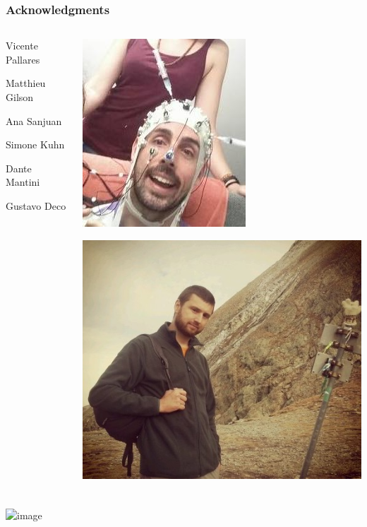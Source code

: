 \documentclass[final]{beamer}
\begin{document}
\begin{frame}
\frametitle{Acknowledgments}
\begin{columns}
\begin{column}{0.5\textwidth}
\begin{center}
	\alert<2>{Vicente Pallares}\\
\vspace{1cm}

\alert<2>{Matthieu Gilson}\\
\vspace{1cm}

\small Ana Sanjuan\\
\vspace{0.5cm}

\small Simone Kuhn\\
\vspace{0.5cm}

\small Dante Mantini\\
\vspace{0.5cm}

\small Gustavo Deco\\
\end{center}
\end{column}
\begin{column}{0.5\textwidth}
\includegraphics[width=0.5\columnwidth,valign=t]{vicente2}
\vspace{0.5cm}

\includegraphics[width=0.5\columnwidth,valign=t]{matt}
\end{column}
\end{columns}
\end{frame}

\begin{frame}
\frametitle{}
\begin{center}
\includegraphics<1>[width=0.6\columnwidth]{minion}
\end{center}
\end{frame}
\end{document}
